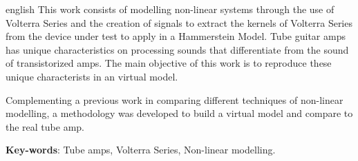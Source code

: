 \begin{resumo}[Abstract]
 \begin{otherlanguage*}{english}
 This work consists of modelling non-linear systems through the use of Volterra Series and the creation of signals to extract the kernels of Volterra Series from the device under test to apply in a Hammerstein Model. Tube guitar amps has unique characteristics on processing sounds that differentiate from the sound of transistorized amps. The main objective of this work is to reproduce these unique characterists in an virtual model.
 
 Complementing a previous work in comparing different techniques of non-linear modelling, a methodology was developed to build a virtual model and compare to the real tube amp.
   \vspace{\onelineskip}
 
   \noindent 
   \textbf{Key-words}: Tube amps, Volterra Series, Non-linear modelling.
 \end{otherlanguage*}
\end{resumo}
